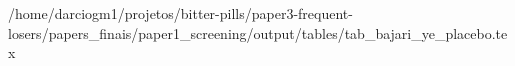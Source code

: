 /home/darciogm1/projetos/bitter-pills/paper3-frequent-losers/papers_finais/paper1_screening/output/tables/tab_bajari_ye_placebo.tex